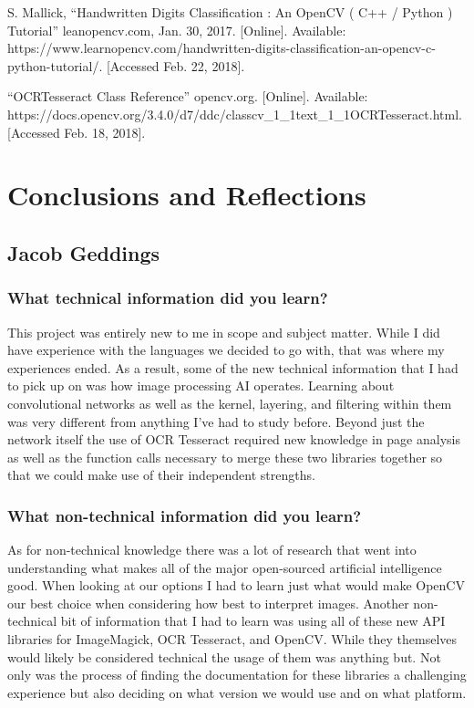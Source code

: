 \documentclass[article, onecolumn, draftclsnofoot,10pt, compsoc]{IEEEtran}
\begin{document}
S. Mallick, “Handwritten Digits Classification : An OpenCV ( C++ / Python ) Tutorial” leanopencv.com, Jan. 30, 2017. [Online]. Available: https://www.learnopencv.com/handwritten-digits-classification-an-opencv-c-python-tutorial/. [Accessed Feb. 22, 2018].

“OCRTesseract Class Reference” opencv.org. [Online]. Available: https://docs.opencv.org/3.4.0/d7/ddc/classcv\_1\_1text\_1\_1OCRTesseract.html. [Accessed Feb. 18, 2018].

\section{Conclusions and Reflections}
\subsection{Jacob Geddings}
\subsubsection{What technical information did you learn?}
This project was entirely new to me in scope and subject matter. While I did have experience with the languages we decided to go with, that was where my experiences ended. As a result, some of the new technical information that I had to pick up on was how image processing AI operates. Learning about convolutional networks as well as the kernel, layering, and filtering within them was very different from anything I’ve had to study before. Beyond just the network itself the use of OCR Tesseract required new knowledge in page analysis as well as the function calls necessary to merge these two libraries together so that we could make use of their independent strengths.

\subsubsection{What non-technical information did you learn?}
As for non-technical knowledge there was a lot of research that went into understanding what makes all of the major open-sourced artificial intelligence good. When looking at our options I had to learn just what would make OpenCV our best choice when considering how best to interpret images. Another non-technical bit of information that I had to learn was using all of these new API libraries for ImageMagick, OCR Tesseract, and OpenCV. While they themselves would likely be considered technical the usage of them was anything but. Not only was the process of finding the documentation for these libraries a challenging experience but also deciding on what version we would use and on what platform.
\end{document}
